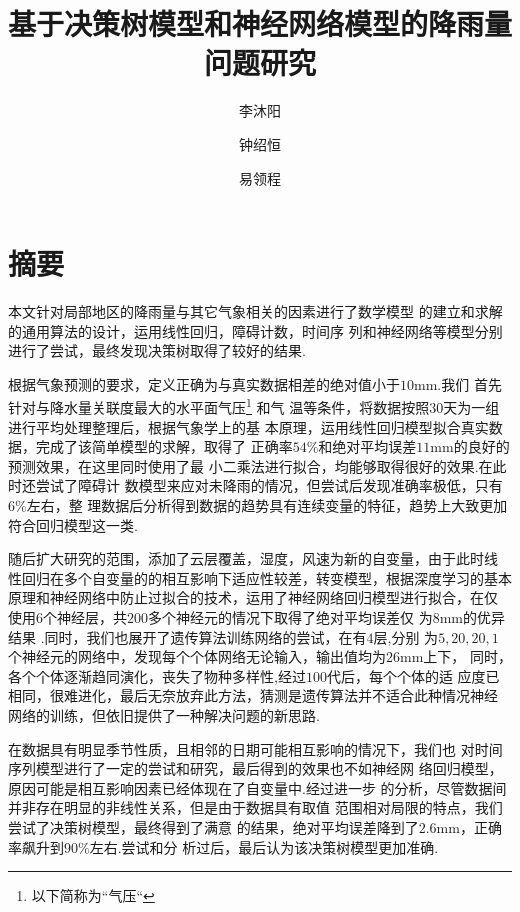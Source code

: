 \documentclass[UTF8, a4paper]{ctexart}
\title{基于决策树模型和神经网络模型的降雨量问题研究}
\author{李沐阳 \and 钟绍恒 \and 易领程}
\begin{document}
\maketitle



\section{摘要}

本文针对局部地区的降雨量与其它气象相关的因素进行了数学模型
的建立和求解的通用算法的设计，运用线性回归，障碍计数，时间序
列和神经网络等模型分别进行了尝试，最终发现决策树取得了较好的结果.

根据气象预测的要求，定义正确为与真实数据相差的绝对值小于$10$\si{\milli\meter}.我们
首先针对与降水量关联度最大的水平面气压\footnote{以下简称为``气压``} 和气
温等条件，将数据按照$30$天为一组进行平均处理整理后，根据气象学上的基
本原理，运用线性回归模型拟合真实数据，完成了该简单模型的求解，取得了
正确率$54 \%$和绝对平均误差$11$\si{\milli\meter}的良好的预测效果，在这里同时使用了最
小二乘法进行拟合，均能够取得很好的效果.在此时还尝试了障碍计
数模型来应对未降雨的情况，但尝试后发现准确率极低，只有$6\%$左右，整
理数据后分析得到数据的趋势具有连续变量的特征，趋势上大致更加符合回归模型这一类.

随后扩大研究的范围，添加了云层覆盖，湿度，风速为新的自变量，由于此时线
性回归在多个自变量的的相互影响下适应性较差，转变模型，根据深度学习的基本
原理和神经网络中防止过拟合的技术，运用了神经网络回归模型进行拟合，在仅
使用$6$个神经层，共$200$多个神经元的情况下取得了绝对平均误差仅
为$8$\si{\milli\meter}的优异结果 .同时，我们也展开了遗传算法训练网络的尝试，在有$4$层,分别
为$5,20,20,1$个神经元的网络中，发现每个个体网络无论输入，输出值均为$26$\si{\milli\meter}上下，
同时，各个个体逐渐趋同演化，丧失了物种多样性,经过$100$代后，每个个体的适
应度已相同，很难进化，最后无奈放弃此方法，猜测是遗传算法并不适合此种情况神经
网络的训练，但依旧提供了一种解决问题的新思路.

在数据具有明显季节性质，且相邻的日期可能相互影响的情况下，我们也
对时间序列模型进行了一定的尝试和研究，最后得到的效果也不如神经网
络回归模型，原因可能是相互影响因素已经体现在了自变量中.经过进一步
的分析，尽管数据间并非存在明显的非线性关系，但是由于数据具有取值
范围相对局限的特点，我们尝试了决策树模型，最终得到了满意
的结果，绝对平均误差降到了$2.6$\si{\milli\meter}，正确率飙升到$90\%$左右.尝试和分
析过后，最后认为该决策树模型更加准确.
\end{document}
